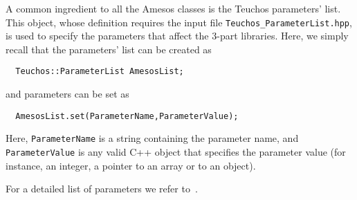 A common ingredient to all the Amesos classes is the Teuchos parameters'
list. This object, whose definition requires the input file
\verb!Teuchos_ParameterList.hpp!, is used to specify the parameters that
affect the 3-part libraries. Here, we simply recall that the parameters'
list can be created as
\begin{verbatim}
  Teuchos::ParameterList AmesosList;
\end{verbatim}
and parameters can be set as
\begin{verbatim}
  AmesosList.set(ParameterName,ParameterValue);
\end{verbatim}
Here, \verb!ParameterName! is a string containing the parameter name,
and \verb!ParameterValue! is any valid C++ object that specifies the
parameter value (for instance, an integer, a pointer to an array or to
an object).

For a detailed list of parameters we refer to~\cite{Amesos-Reference-Guide}.
